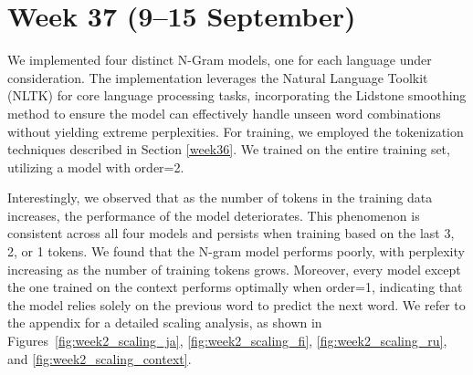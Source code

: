 \documentclass[11pt]{article}
\begin{document}
\section{Week 37 (9--15 September)}
\label{sec:week37}

We implemented four distinct N-Gram models, one for each language under consideration. 
The implementation leverages the Natural Language Toolkit (NLTK) for core language processing tasks, incorporating the Lidstone smoothing method to ensure the model can effectively handle unseen word combinations without yielding extreme perplexities.
For training, we employed the tokenization techniques described in Section \ref{week36}. We trained on the entire training set, utilizing a model with order=2.

\begin{table}[ht]
    \centering
    \caption{Language Model Performance}
    \label{tab:language_model_performance}
\end{table}

Interestingly, we observed that as the number of tokens in the training data increases, the performance of the model deteriorates. 
This phenomenon is consistent across all four models and persists when training based on the last 3, 2, or 1 tokens. 
We found that the N-gram model performs poorly, with perplexity increasing as the number of training tokens grows. Moreover, every model except the one trained on the context performs optimally when order=1, indicating that the model relies solely on the previous word to predict the next word.
We refer to the appendix for a detailed scaling analysis, as shown in Figures~\ref{fig:week2_scaling_ja}, \ref{fig:week2_scaling_fi}, \ref{fig:week2_scaling_ru}, and \ref{fig:week2_scaling_context}.  
\end{document}

